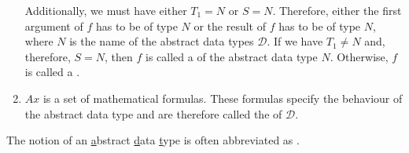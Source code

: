 \begin{enumerate}
      Additionally, we must have either $T_1 = N$ or $S = N$.  Therefore, either
      the first argument of $f$ has to be of type $N$ or the result of $f$ has to be of type 
      $N$, where $N$ is the name of the abstract data types $\mathcal{D}$.  If we have  $T_1 \not= N$ and, therefore,
      $S = N$, then $f$ is called a  of the abstract data type $N$.  
      Otherwise,  $f$ is called a  .
\item $Ax$ is a set of mathematical formulas.   These formulas 
      specify the behaviour of the abstract data type and are therefore called
      the  of $\mathcal{D}$.
\end{enumerate}
The notion of an \underline{a}bstract \underline{d}ata \underline{t}ype is often abbreviated as \textsc{}.

